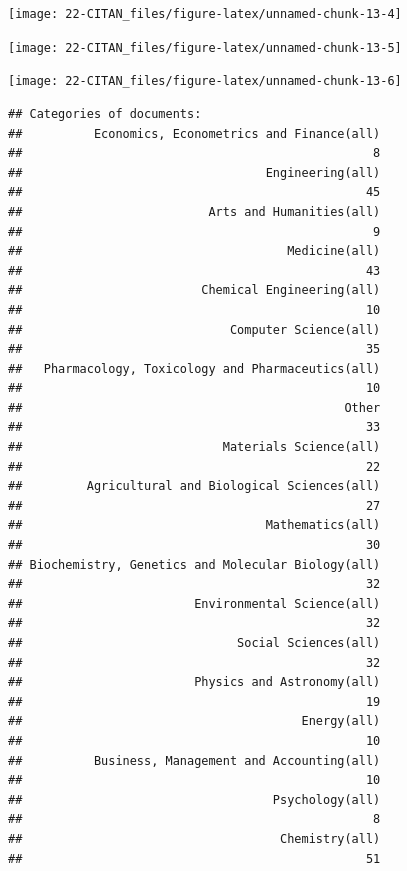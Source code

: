 \documentclass[]{book}
\begin{document}
\begin{center}\texttt{[image: 22-CITAN\_files/figure-latex/unnamed-chunk-13-4]} \end{center}

\begin{center}\texttt{[image: 22-CITAN\_files/figure-latex/unnamed-chunk-13-5]} \end{center}

\begin{center}\texttt{[image: 22-CITAN\_files/figure-latex/unnamed-chunk-13-6]} \end{center}

\begin{verbatim}
## Categories of documents:
##          Economics, Econometrics and Finance(all) 
##                                                 8 
##                                  Engineering(all) 
##                                                45 
##                          Arts and Humanities(all) 
##                                                 9 
##                                     Medicine(all) 
##                                                43 
##                         Chemical Engineering(all) 
##                                                10 
##                             Computer Science(all) 
##                                                35 
##   Pharmacology, Toxicology and Pharmaceutics(all) 
##                                                10 
##                                             Other 
##                                                33 
##                            Materials Science(all) 
##                                                22 
##         Agricultural and Biological Sciences(all) 
##                                                27 
##                                  Mathematics(all) 
##                                                30 
## Biochemistry, Genetics and Molecular Biology(all) 
##                                                32 
##                        Environmental Science(all) 
##                                                32 
##                              Social Sciences(all) 
##                                                32 
##                        Physics and Astronomy(all) 
##                                                19 
##                                       Energy(all) 
##                                                10 
##          Business, Management and Accounting(all) 
##                                                10 
##                                   Psychology(all) 
##                                                 8 
##                                    Chemistry(all) 
##                                                51
\end{verbatim}
\end{document}
